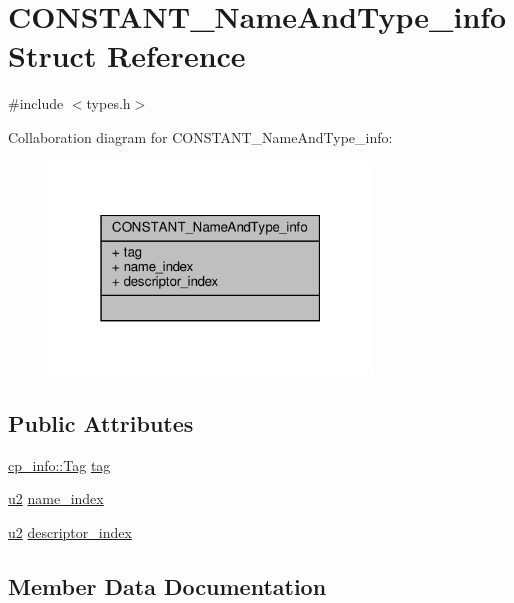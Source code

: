 \hypertarget{structCONSTANT__NameAndType__info}{}\section{C\+O\+N\+S\+T\+A\+N\+T\+\_\+\+Name\+And\+Type\+\_\+info Struct Reference}
\label{structCONSTANT__NameAndType__info}


{\ttfamily \#include $<$types.\+h$>$}



Collaboration diagram for C\+O\+N\+S\+T\+A\+N\+T\+\_\+\+Name\+And\+Type\+\_\+info\+:\nopagebreak
\begin{figure}[H]
\begin{center}
\leavevmode
\includegraphics[width=244pt]{structCONSTANT__NameAndType__info__coll__graph}
\end{center}
\end{figure}
\subsection*{Public Attributes}
\begin{DoxyCompactItemize}
\item 
\hyperlink{structcp__info_acdef8472ed83e12e3a87bca8d6001f69}{cp\+\_\+info\+::\+Tag} \hyperlink{structCONSTANT__NameAndType__info_a5a4f7d881529f76682bf58fd56d34d29}{tag}
\item 
\hyperlink{types_8h_ae676e9207f57fb921dca7366b2f59c53}{u2} \hyperlink{structCONSTANT__NameAndType__info_adbaa813f9f3a32dc04a8bc65b5b2433d}{name\+\_\+index}
\item 
\hyperlink{types_8h_ae676e9207f57fb921dca7366b2f59c53}{u2} \hyperlink{structCONSTANT__NameAndType__info_a5066151677d138f5ee57e5e16efd4d5e}{descriptor\+\_\+index}
\end{DoxyCompactItemize}


\subsection{Member Data Documentation}
\mbox{\label{structCONSTANT__NameAndType__info_a5066151677d138f5ee57e5e16efd4d5e}} 
